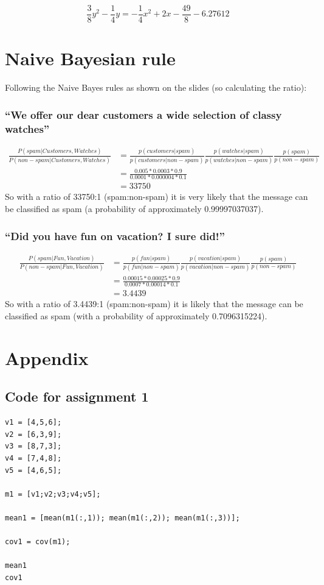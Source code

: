 \documentclass[10pt]{article}
\begin{document}
\begin{equation}
\frac{3}{8}y^2 - \frac{1}{4}y = -\frac{1}{4}x^2+2x-\frac{49}{8} -6.27612
\end{equation}


\section{Naive Bayesian rule}
Following the Naive Bayes rules as shown on the slides (so calculating the ratio):

\subsubsection{``We offer our dear customers a wide selection of classy watches''}
\begin{align}
\frac{P(spam|Customers,Watches)}{P(non-spam|Customers,Watches)}
 & = \frac{p(customers|spam)}{p(customers|non-spam)} \frac{p(watches|spam)}{p(watches|non-spam)} \frac{p(spam)}{p(non-spam)} \\
 & = \frac{0.005*0.0003*0.9}{0.0001*0.000004*0.1} \\
 & = 33750
\end{align}
So with a ratio of 33750:1 (spam:non-spam) it is very likely that the message can be classified as spam (a probability of approximately 0.99997037037).

\subsubsection{``Did you have fun on vacation? I sure did!''}
\begin{align}
\frac{P(spam|Fun,Vacation)}{P(non-spam|Fun,Vacation)}
& = \frac{p(fun|spam)}{p(fun|non-spam)} \frac{p(vacation|spam)}{p(vacation|non-spam)} \frac{p(spam)}{p(non-spam)} \\
& = \frac{0.00015*0.00025*0.9}{0.0007*0.00014*0.1} \\
& = 3.4439
\end{align}
So with a ratio of 3.4439:1 (spam:non-spam) it is likely that the message can be classified as spam (with a probability of approximately 0.7096315224).

\section*{Appendix}
\subsection*{Code for assignment 1}
\begin{lstlisting}
v1 = [4,5,6];
v2 = [6,3,9];
v3 = [8,7,3];
v4 = [7,4,8];
v5 = [4,6,5];

m1 = [v1;v2;v3;v4;v5];

mean1 = [mean(m1(:,1)); mean(m1(:,2)); mean(m1(:,3))];

cov1 = cov(m1);

mean1
cov1
\end{lstlisting}
\end{document}
